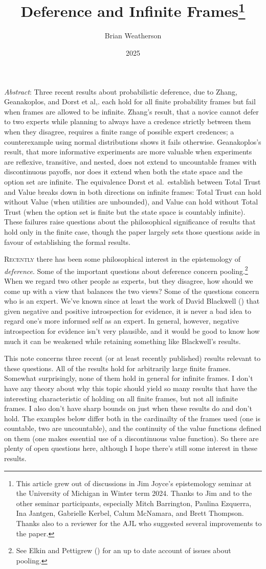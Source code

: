 \documentclass[
  11pt,
  letterpaper,
  DIV=11,
  numbers=noendperiod,
  twoside]{scrartcl}
\title{Deference and Infinite Frames\thanks{This article grew out of
discussions in Jim Joyce's epistemology seminar at the University of
Michigan in Winter term 2024. Thanks to Jim and to the other seminar
participants, especially Mitch Barrington, Paulina Ezquerra, Ina
Jantgen, Gabrielle Kerbel, Calum McNamara, and Brett Thompson. Thanks
also to a reviewer for the AJL who suggested several improvements to the
paper.}}
\author{Brian Weatherson}
\date{2025}
\renewenvironment{abstract}
 {\vspace{-1.25cm}
 \quotation\small\noindent\emph{Abstract}:}
 {\endquotation}
\renewenvironment{abstract}
 {\quotation\small\noindent\emph{Abstract}:}
 {\endquotation\vspace{-0.02cm}}
\begin{document}
\maketitle
\begin{abstract}
Three recent results about probabilistic deference, due to Zhang,
Geanakoplos, and Dorst et al,. each hold for all finite probability
frames but fail when frames are allowed to be infinite. Zhang's result,
that a novice cannot defer to two experts while planning to always have
a credence strictly between them when they disagree, requires a finite
range of possible expert credences; a counterexample using normal
distributions shows it fails otherwise. Geanakoplos's result, that more
informative experiments are more valuable when experiments are
reflexive, transitive, and nested, does not extend to uncountable frames
with discontinuous payoffs, nor does it extend when both the state space
and the option set are infinite. The equivalence Dorst et al.~establish
between Total Trust and Value breaks down in both directions on infinite
frames: Total Trust can hold without Value (when utilities are
unbounded), and Value can hold without Total Trust (when the option set
is finite but the state space is countably infinite). These failures
raise questions about the philosophical significance of results that
hold only in the finite case, though the paper largely sets those
questions aside in favour of establishing the formal results.
\end{abstract}


\lettrine{R}{ecently} there has been some philosophical interest in the
epistemology of \emph{deference}. Some of the important questions about
deference concern pooling.\footnote{See Elkin and Pettigrew
  () for an up to date account of
  issues about pooling.} When we regard two other people as experts, but
they disagree, how should we come up with a view that balances the two
views? Some of the questions concern who is an expert. We've known since
at least the work of David Blackwell
() that given negative and positive
introspection for evidence, it is never a bad idea to regard one's more
informed self as an expert. In general, however, negative introspection
for evidence isn't very plausible, and it would be good to know how much
it can be weakened while retaining something like Blackwell's results.

This note concerns three recent (or at least recently published) results
relevant to these questions. All of the results hold for arbitrarily
large finite frames. Somewhat surprisingly, none of them hold in general
for infinite frames. I don't have any theory about why this topic should
yield so many results that have the interesting characteristic of
holding on all finite frames, but not all infinite frames. I also don't
have sharp bounds on just when these results do and don't hold. The
examples below differ both in the cardinailty of the frames used (one is
countable, two are uncountable), and the continuity of the value
functions defined on them (one makes essential use of a discontinuous
value function). So there are plenty of open questions here, although I
hope there's still some interest in these results.
\end{document}
